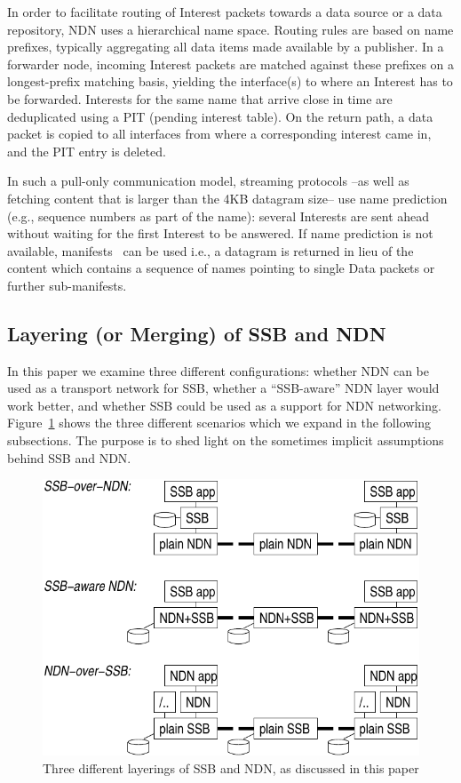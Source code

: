 \documentclass[9pt,sigconf,rewiew]{acmart}
\begin{document}
In order to facilitate routing of Interest packets towards a data
source or a data repository, NDN uses a hierarchical name
space. Routing rules are based on name prefixes, typically aggregating
all data items made available by a publisher. In a forwarder node,
incoming Interest packets are matched against these prefixes on a
longest-prefix matching basis, yielding the interface(s) to where an
Interest has to be forwarded. Interests for the same name that arrive
close in time are deduplicated using a PIT (pending interest
table). On the return path, a data packet is copied to all interfaces
from where a corresponding interest came in, and the PIT entry is
deleted.

In such a pull-only communication model, streaming protocols --as well
as fetching content that is larger than the 4KB datagram size-- use
name prediction (e.g., sequence numbers as part of the name): several
Interests are sent ahead without waiting for the first Interest to be
answered. If name prediction is not available,
manifests~\cite{DBLP:conf/infocom/BaugherDNO12} can be used i.e., a datagram is returned in
lieu of the content which contains a sequence of names pointing to
single Data packets or further sub-manifests.

\subsection{Layering (or Merging) of SSB and NDN}

In this paper we examine three different configurations: whether NDN
can be used as a transport network for SSB, whether a ``SSB-aware''
NDN layer would work better, and whether SSB could be used as a
support for NDN networking. Figure~\ref{fig:ssb-and-ndn} shows the
three different scenarios which we expand in the following
subsections. The purpose is to shed light on the sometimes implicit
assumptions behind SSB and NDN.

\begin{figure}[htb]
  \raggedright
  \includegraphics[width=0.9\columnwidth]{figs/ssb-and-ndn.pdf}
  \caption{\label{fig:ssb-and-ndn}Three different layerings of SSB and NDN,
    as discussed in this paper}
\end{figure}
\end{document}
